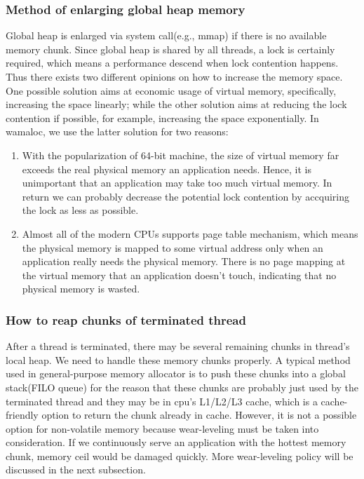 \documentclass{vldb}
\begin{document}
\subsubsection{Method of enlarging global heap memory}
Global heap is enlarged via system call(e.g., mmap) if there is no available memory chunk.
Since global heap is shared by all threads, a lock is certainly required, which means a performance descend when lock contention happens.
Thus there exists two different opinions on how to increase the memory space. 
One possible solution aims at economic usage of virtual memory, specifically, increasing the space linearly;
while the other solution aims at reducing the lock contention if possible, for example, increasing the space exponentially. 
In wamaloc, we use the latter solution for two reasons: 
\begin{enumerate}
    \item With the popularization of 64-bit machine, the size of virtual memory far exceeds the real physical memory an application needs.
Hence, it is unimportant that an application may take too much virtual memory. In return we can probably decrease the potential lock contention by accquiring the lock as less as possible.
    \item Almost all of the modern CPUs supports page table mechanism, which means the physical memory is mapped to some virtual address only when an application really needs the physical memory. There is no page mapping at the virtual memory that an application doesn't touch, indicating that no physical memory is wasted.
\end{enumerate}

\subsubsection{How to reap chunks of terminated thread}
After a thread is terminated, there may be several remaining chunks in thread's local heap. 
We need to handle these memory chunks properly.
A typical method used in general-purpose memory allocator is to push these chunks into a global stack(FILO queue)
for the reason that these chunks are probably just used by the terminated thread and they may be in cpu's L1/L2/L3 cache, which is a cache-friendly option to return the chunk already in cache.
However, it is not a possible option for non-volatile memory because wear-leveling must be taken into consideration.
If we continuously serve an application with the hottest memory chunk, memory ceil would be damaged quickly.
More wear-leveling policy will be discussed in the next subsection.
\end{document}
